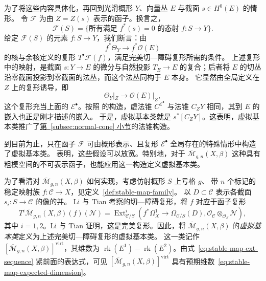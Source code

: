 \begin{example}\label{ex:zero-scheme-obstruction-theory}
为了将这些内容具体化，再回到光滑概形 $Y$、向量丛 $E$ 与截面 $s\in H^0(E)$ 的情形。
令 $\mathcal F$ 为由 $Z=Z(s)$ 表示的函子。换言之，
\[
\mathcal F(S)=\{\text{所有满足 }f^*(s)=0\text{ 的态射 }f:S\to Y\}.
\]
给定 $\mathcal F(S)$ 的元素 $f:S\to Y$，我们断言：由
\[
f^*\Theta_Y\longrightarrow f^*\mathcal O(E)
\]
的核与余核定义的复形 $T^\bullet\mathcal F(f)$，满足完美切—障碍复形所需的条件。
上述复形中的映射，是截面 $s:Y\to E$ 的微分与自然投影 $T_E\to E$ 的复合；后者将 $E$ 的切丛沿零截面投影到零截面的法丛，而这个法丛同构于 $E$ 本身。
它显然由全局定义在 $Z$ 上的复形诱导，即
\begin{equation}\label{eq:zero-scheme-tangent-obstruction-complex}
\Theta_Y|_Z\longrightarrow\mathcal O(E)|_Z,
\end{equation}
这个复形充当上面的 $\mathcal E^\bullet$。按照  的构造，虚法锥
$C^{\mathcal E^\bullet}$ 与法锥 $C_ZY$ 相同，其到 $E$ 的嵌入也正是刚才描述的嵌入。
于是，虚拟基本类就是 $s^*[C_ZY]$。这表明，虚拟基本类推广了\hyperref[subsec:normal-cone]{第~\ref*{subsec:normal-cone} 小节}的法锥构造。
\end{example}

到目前为止，只在函子 $\mathcal F$ 可由概形表示、且复形 $\mathcal E^\bullet$ 全局存在的特殊情形中构造了虚拟基本类。
 表明，这些假设可以放宽。特别地，对于
$\overline{\mathcal M}_{g,n}(X,\beta)$ 这种具有粗模空间的不可表示函子，也能应用这一构造定义虚拟基本类。

为了看清对 $\overline{\mathcal M}_{g,n}(X,\beta)$ 如何实现，考虑仿射概形 $S$ 上亏格 $g$、
带 $n$ 个标记的稳定映射族 $f:\mathcal C\to X$，见定义~\ref{def:stable-map-family}。
以 $D\subset\mathcal C$ 表示各截面 $s_i:S\to\mathcal C$ 的像的并。
Li 与 Tian 考察的切—障碍复形，将 $f$ 对应于函子复形
\begin{equation}\label{eq:stable-map-relative-obstruction-complex}
T^i\overline{\mathcal M}_{g,n}(X,\beta)(f)(\mathcal N)
=\operatorname{Ext}_{\mathcal C/S}^i
\left(f^*\Omega_X^1\longrightarrow\Omega_{\mathcal C/S}(D),
\mathcal O_{\mathcal C}\otimes_{\mathcal O_S}\mathcal N\right),
\end{equation}
其中 $i=1,2$。Li 与 Tian 证明，这是完美复形。因此，将
$\overline{\mathcal M}_{g,n}(X,\beta)$ 的\emph{虚拟基本类}定义为上述完美切—障碍复形的虚拟基本类。
这一类记作 $[\overline{\mathcal M}_{g,n}(X,\beta)]^{\mathrm{virt}}$，其维数为
$\operatorname{rk}(E^1)-\operatorname{rk}(E^2)$。由式~\eqref{eq:stable-map-ext-sequence} 紧前面的表达式，可见
$[\overline{\mathcal M}_{g,n}(X,\beta)]^{\mathrm{virt}}$ 具有预期维数~\eqref{eq:stable-map-expected-dimension}。

